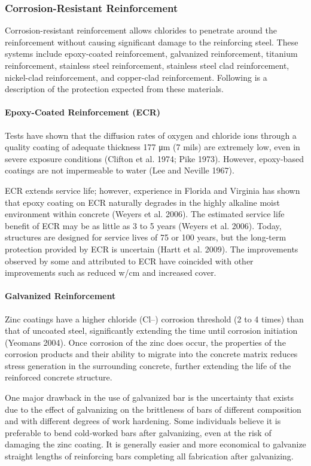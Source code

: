 \subsubsection{Corrosion-Resistant Reinforcement}
Corrosion-resistant reinforcement allows chlorides to penetrate around the reinforcement without causing
significant damage to the reinforcing steel. These systems include epoxy-coated reinforcement, galvanized
reinforcement, titanium reinforcement, stainless steel reinforcement, stainless steel clad reinforcement, nickel-clad
reinforcement, and copper-clad reinforcement. Following is a description of the protection expected from these
materials.
\paragraph{Epoxy-Coated Reinforcement (ECR)}
Tests have shown that the diffusion rates of oxygen and chloride ions through a quality coating of adequate
thickness 177 μm (7 mils) are extremely low, even in severe exposure conditions (Clifton et al. 1974; Pike 1973).
However, epoxy-based coatings are not impermeable to water (Lee and Neville 1967).

ECR extends service life; however, experience in Florida and Virginia has shown that epoxy coating on ECR
naturally degrades in the highly alkaline moist environment within concrete (Weyers et al. 2006). The estimated
service life benefit of ECR may be as little as 3 to 5 years (Weyers et al. 2006). Today, structures are designed for
service lives of 75 or 100 years, but the long-term protection provided by ECR is uncertain (Hartt et al. 2009). The
improvements observed by some and attributed to ECR have coincided with other improvements such as reduced
w/cm and increased cover.

\paragraph{Galvanized Reinforcement}
Zinc coatings have a higher chloride (Cl–) corrosion threshold (2 to 4 times) than that of uncoated steel,
significantly extending the time until corrosion initiation (Yeomans 2004). Once corrosion of the zinc does occur,
the properties of the corrosion products and their ability to migrate into the concrete matrix reduces stress generation
in the surrounding concrete, further extending the life of the reinforced concrete structure.

One major drawback in the use of galvanized bar is the uncertainty that exists due to the effect of galvanizing on
the brittleness of bars of different composition and with different degrees of work hardening. Some individuals
believe it is preferable to bend cold-worked bars after galvanizing, even at the risk of damaging the zinc coating. It is
generally easier and more economical to galvanize straight lengths of reinforcing bars completing all fabrication after
galvanizing.

